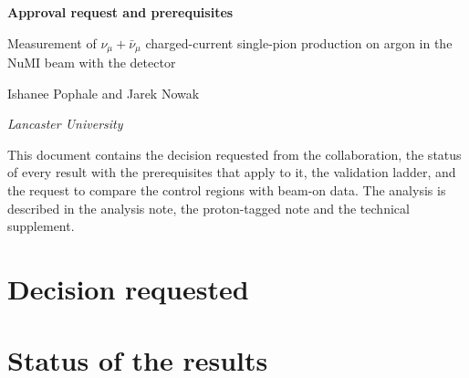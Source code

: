 

\usepackage{xr}



\newcommand{\noteref}[2]{#1~\ref{N-#2} of the analysis note}
\newcommand{\ptref}[2]{#1~\ref{P-#2} of the proton-tagged note}
\newcommand{\suppref}[2]{#1~\ref{S-#2} of the technical supplement}
\newcommand{\inclref}[2]{\noteref{#1}{#2}}



\begin{center}
{\LARGE\bfseries Approval request and prerequisites\par}
\vspace{0.4cm}
{\large Measurement of $\nu_\mu+\bar\nu_\mu$ charged-current single-pion production on argon in the NuMI
beam with the \uboone{} detector\par}
\vspace{0.4cm}
{\large Ishanee Pophale and Jarek Nowak\par}
\vspace{0.2cm}
{\normalsize\itshape Lancaster University\par}
\end{center}
\vspace{0.4cm}

This document contains the decision requested from the collaboration, the status of every result with
the prerequisites that apply to it, the validation ladder, and the request to compare the control
regions with beam-on data. The analysis is described in the analysis note, the proton-tagged note and
the technical supplement.

\tableofcontents

\section{Decision requested}
\label{sec:ar_decision}



\section{Status of the results}
\label{sec:ar_status}

